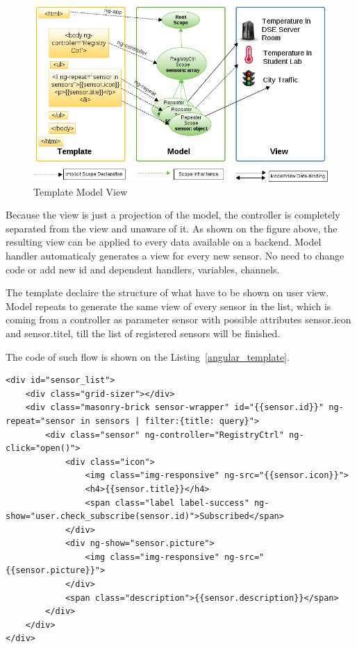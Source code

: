     \begin{figure}[!ht]
	\centering
	\includegraphics[scale=0.6]{images/3wayBinding.png}   
	\caption[Template Model View]{Template Model View} 
	\label{img:tmv}
	\end{figure}
    
Because the view is just a projection of the model, the controller is completely separated from the view and unaware of it. As shown on the figure above, the resulting view can be applied to every data available on a backend. Model handler automaticaly generates a view for every new sensor. No need to change code or add new id and dependent handlers, variables, channels. 

The template declaire the structure of what have to be shown on user view. Model repeats to generate the same view of every sensor in the list, which is coming from a controller as parameter {{sensor}} with possible attributes {{sensor.icon}} and {{sensor.titel}}, till the list of registered sensors will be finished.

The code of such flow is shown on the Listing~\ref{angular_template}.

	\begin{lstlisting}[label=angular_template,caption=Template registry.html]
<div id="sensor_list">
    <div class="grid-sizer"></div>
    <div class="masonry-brick sensor-wrapper" id="{{sensor.id}}" ng-repeat="sensor in sensors | filter:{title: query}">
        <div class="sensor" ng-controller="RegistryCtrl" ng-click="open()">
            <div class="icon">
                <img class="img-responsive" ng-src="{{sensor.icon}}">
                <h4>{{sensor.title}}</h4>
                <span class="label label-success" ng-show="user.check_subscribe(sensor.id)">Subscribed</span>
            </div>
            <div ng-show="sensor.picture">
                <img class="img-responsive" ng-src="{{sensor.picture}}">
            </div>
            <span class="description">{{sensor.description}}</span>
        </div>
    </div>
</div>
    \end{lstlisting}

